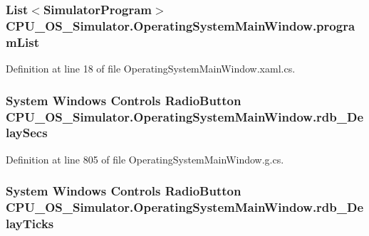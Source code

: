 \subsubsection[{program\+List}]{\setlength{\rightskip}{0pt plus 5cm}List$<${\bf Simulator\+Program}$>$ C\+P\+U\+\_\+\+O\+S\+\_\+\+Simulator.\+Operating\+System\+Main\+Window.\+program\+List\hspace{0.3cm}{\ttfamily [private]}}\label{class_c_p_u___o_s___simulator_1_1_operating_system_main_window_a83bef5323931616842c44d3f8d477fd2}


Definition at line 18 of file Operating\+System\+Main\+Window.\+xaml.\+cs.

\hypertarget{class_c_p_u___o_s___simulator_1_1_operating_system_main_window_a7b4585b869d26fa4e7d419a064f4f73c}{}
\subsubsection[{rdb\+\_\+\+Delay\+Secs}]{\setlength{\rightskip}{0pt plus 5cm}System Windows Controls Radio\+Button C\+P\+U\+\_\+\+O\+S\+\_\+\+Simulator.\+Operating\+System\+Main\+Window.\+rdb\+\_\+\+Delay\+Secs\hspace{0.3cm}{\ttfamily [package]}}\label{class_c_p_u___o_s___simulator_1_1_operating_system_main_window_a7b4585b869d26fa4e7d419a064f4f73c}


Definition at line 805 of file Operating\+System\+Main\+Window.\+g.\+cs.

\hypertarget{class_c_p_u___o_s___simulator_1_1_operating_system_main_window_a7b70deef80df6719fc0b7b9c87c268d7}{}
\subsubsection[{rdb\+\_\+\+Delay\+Ticks}]{\setlength{\rightskip}{0pt plus 5cm}System Windows Controls Radio\+Button C\+P\+U\+\_\+\+O\+S\+\_\+\+Simulator.\+Operating\+System\+Main\+Window.\+rdb\+\_\+\+Delay\+Ticks\hspace{0.3cm}{\ttfamily [package]}}\label{class_c_p_u___o_s___simulator_1_1_operating_system_main_window_a7b70deef80df6719fc0b7b9c87c268d7}



